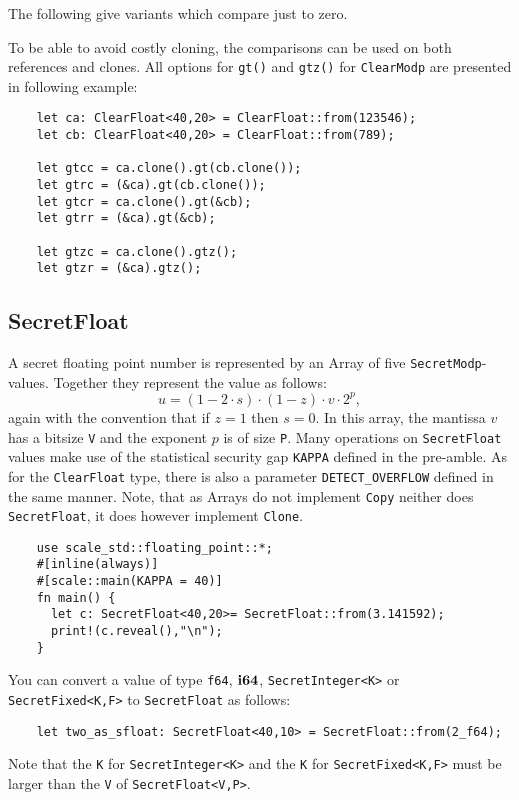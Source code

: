 \noindent
The following give variants which compare just to zero.

To be able to avoid costly cloning, the comparisons can be used on both 
references and clones. All options for \verb|gt()| and \verb|gtz()| for  
\verb|ClearModp| are presented in following example:
\begin{lstlisting}
    let ca: ClearFloat<40,20> = ClearFloat::from(123546);
    let cb: ClearFloat<40,20> = ClearFloat::from(789);

    let gtcc = ca.clone().gt(cb.clone());
    let gtrc = (&ca).gt(cb.clone());
    let gtcr = ca.clone().gt(&cb);
    let gtrr = (&ca).gt(&cb);

    let gtzc = ca.clone().gtz();
    let gtzr = (&ca).gtz();
\end{lstlisting}


\subsection{SecretFloat}
A secret floating point number is represented by an Array of five 
\verb|SecretModp|-values. 
Together they represent the value as follows:
\[ u=(1-2\cdot s) \cdot (1-z) \cdot v \cdot 2^{p}, \]
again with the convention that if $z=1$ then $s=0$.
In this array, the mantissa $v$ has a bitsize \verb|V| and the exponent 
$p$ is of size \verb|P|. 
Many operations on \verb|SecretFloat| values make use of the statistical 
security gap \verb|KAPPA| defined in the pre-amble. 
As for the \verb|ClearFloat| type, there is also a parameter \verb|DETECT_OVERFLOW|
defined in the same manner.
Note, that as Arrays do not implement \verb|Copy| neither does  \verb|SecretFloat|,
it does however implement \verb|Clone|.


\begin{lstlisting}
    use scale_std::floating_point::*;
    #[inline(always)]
    #[scale::main(KAPPA = 40)]
    fn main() {
      let c: SecretFloat<40,20>= SecretFloat::from(3.141592);
      print!(c.reveal(),"\n");
    }
\end{lstlisting}

You can convert a value of type \verb|f64|, $\mathbf{i64}$, \verb|SecretInteger<K>| 
or \verb|SecretFixed<K,F>|  to 
\verb|SecretFloat| as follows:
\begin{lstlisting}
    let two_as_sfloat: SecretFloat<40,10> = SecretFloat::from(2_f64);
\end{lstlisting}
Note that the \verb|K| for \verb|SecretInteger<K>| and the \verb|K| for \verb|SecretFixed<K,F>| 
must be larger than the \verb|V| of \verb|SecretFloat<V,P>|.


